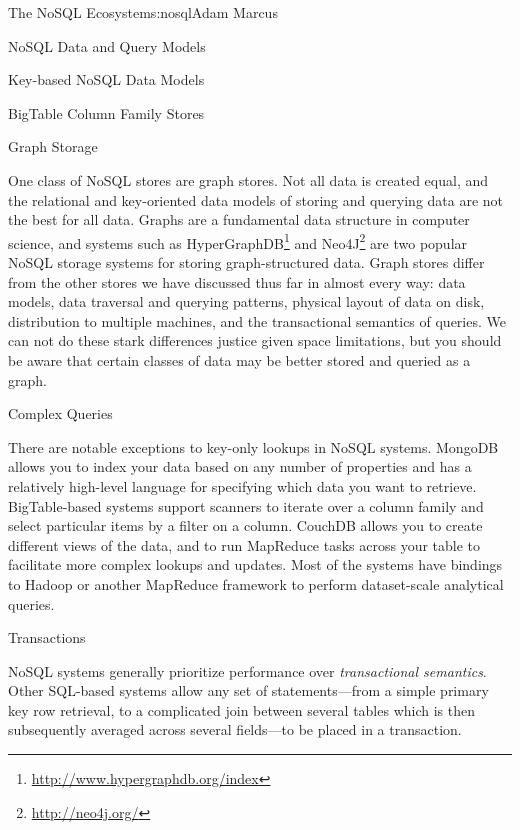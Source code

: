 \begin{aosachapter}{The NoSQL Ecosystem}{s:nosql}{Adam Marcus}
\begin{aosasect1}{NoSQL Data and Query Models}
\begin{aosasect2}{Key-based NoSQL Data Models}
\begin{aosasect3}{BigTable Column Family Stores}
\end{aosasect3}

\end{aosasect2}

\begin{aosasect2}{Graph Storage}

One class of NoSQL stores are graph stores.  Not all data is created
equal, and the relational and key-oriented data models of storing and
querying data are not the best for all data.  Graphs are a fundamental
data structure in computer science, and systems such as HyperGraphDB\footnote{\url{http://www.hypergraphdb.org/index}}
and Neo4J\footnote{\url{http://neo4j.org/}} are two popular NoSQL storage systems for storing
graph-structured data.  Graph stores differ from the other stores we
have discussed thus far in almost every way: data models, data
traversal and querying patterns, physical layout of data on disk,
distribution to multiple machines, and the transactional semantics of
queries.  We can not do these stark differences justice given space
limitations, but you should be aware that certain classes of data may
be better stored and queried as a graph.

\end{aosasect2}

\begin{aosasect2}{Complex Queries}

There are notable exceptions to key-only lookups in NoSQL systems.
MongoDB allows you to index your data based on any number of
properties and has a relatively high-level language for specifying
which data you want to retrieve.  BigTable-based systems support
scanners to iterate over a column family and select particular items by a
filter on a column.  CouchDB allows you to create different views of
the data, and to run MapReduce tasks across your table to facilitate
more complex lookups and updates.  Most of the systems have bindings
to Hadoop or another MapReduce framework to perform dataset-scale
analytical queries.

\end{aosasect2}

\begin{aosasect2}{Transactions}

NoSQL systems generally prioritize performance over
\emph{transactional semantics}.  Other SQL-based systems allow any set
of statements---from a simple primary key row retrieval, to a
complicated join between several tables which is then subsequently
averaged across several fields---to be placed in a transaction.


\end{aosasect2}
\end{aosasect1}
\end{aosachapter}
